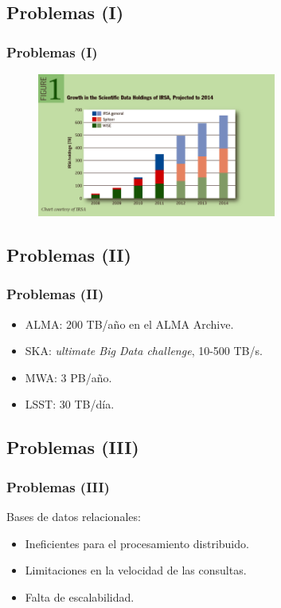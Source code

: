 \documentclass[serif,12pt]{beamer}
\begin{document}
\subsection{Problemas (I)}

\begin{frame}
\frametitle{Problemas (I)}

\begin{figure}
\centering
\includegraphics[width=0.7\textwidth, height=0.7\textheight]{images/data_rates.png} 
\label{fig:data_rates}
\end{figure}


\end{frame}
\subsection{Problemas (II)}

\begin{frame}
\frametitle{Problemas (II)}

\begin{itemize}
\item ALMA: 200 TB/año en el ALMA Archive.
\item SKA: \emph{ultimate Big Data challenge}, 10-500 TB/s.
\item MWA: 3 PB/año.
\item LSST: 30 TB/día.
\end{itemize}


\end{frame}
\subsection{Problemas (III)}

\begin{frame}
\frametitle{Problemas (III)}

Bases de datos relacionales:\newline
\begin{itemize}
\item Ineficientes para el procesamiento distribuido.
\item Limitaciones en la velocidad de las consultas.
\item Falta de escalabilidad.
\end{itemize}


\end{frame}
\end{document}
